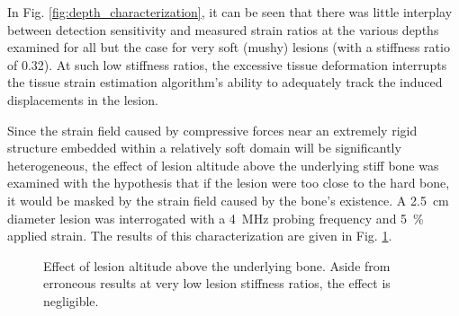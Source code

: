 			In Fig. \ref{fig:depth_characterization}, it can be seen that there was little interplay between detection sensitivity and measured strain ratios at the various depths examined for all but the case for very soft (mushy) lesions (with a stiffness ratio of 0.32). At such low stiffness ratios, the excessive tissue deformation interrupts the tissue strain estimation algorithm's ability to adequately track the induced displacements in the lesion.

			Since the strain field caused by compressive forces near an extremely rigid structure embedded within a relatively soft domain will be significantly heterogeneous, the effect of lesion altitude above the underlying stiff bone was examined with the hypothesis that if the lesion were too close to the hard bone, it would be masked by the strain field caused by the bone's existence. A \SI{2.5}{\cm} diameter lesion was interrogated with a \SI{4}{\MHz} probing frequency and \SI{5}{\percent} applied strain. The results of this characterization are given in Fig. \ref{fig:bottomsep_characterization}.

			\begin{figure}[!t]
				\centering
				\caption[Quasi-static lesion altitude characterization]{Effect of lesion altitude above the underlying bone. Aside from erroneous results at very low lesion stiffness ratios, the effect is negligible.}
				\label{fig:bottomsep_characterization}
			\end{figure}

